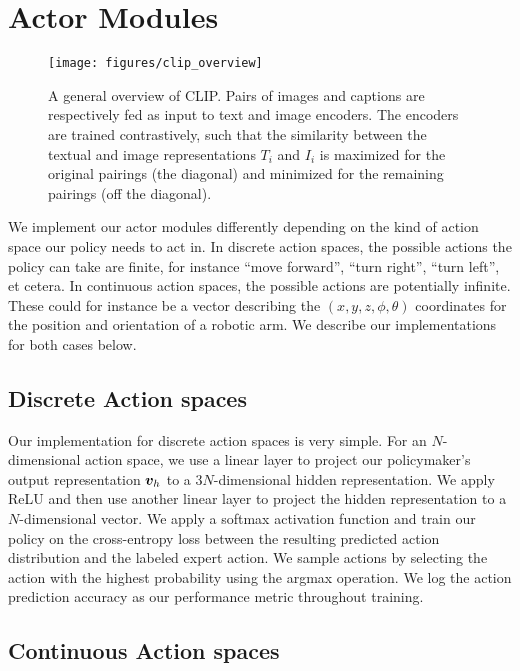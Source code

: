 \documentclass[../main.tex]{subfiles}
\begin{document}
\section{Actor Modules}\label{meth:sec:actor-modules}

\begin{figure}[t]
	\centering
	\texttt{[image: figures/clip\_overview]}
	\caption[General overview of CLIP.]{A general overview of CLIP. Pairs of images and captions are
		respectively fed as input to text and image encoders. The encoders are trained contrastively,
		such that the similarity between the textual and image representations $T_i$ and $I_i$ is
		maximized for the original pairings (the diagonal) and minimized for the remaining pairings (off
		the diagonal).}
	\label{fig:clip}
\end{figure}

We implement our actor modules differently depending on the kind of action space our policy needs to
act in. In discrete action spaces, the possible actions the policy can take are finite, for instance ``move forward'', ``turn right'', ``turn left'', et cetera. In continuous
action spaces, the possible actions are potentially infinite. These could for
instance be a vector describing the $(x, y, z, \phi, \theta)$ coordinates for the position and
orientation of a robotic arm. We describe our implementations for both cases below.

\subsection{Discrete Action spaces}\label{meth:sec:actor-modules:discrete}

Our implementation for discrete action spaces is very simple. For an $N$-dimensional action space,
we use a linear layer to project our policymaker's output representation $\bm v_h$ to
a $3N$-dimensional hidden representation. We apply ReLU and then use another linear layer to project
the hidden representation to a $N$-dimensional vector. We apply a softmax activation function and
train our policy on the cross-entropy loss between the resulting predicted action distribution and
the labeled expert action. We sample actions by selecting the action with the highest probability
using the argmax operation. We log the action prediction accuracy as our performance metric
throughout training.

\subsection{Continuous Action spaces}\label{meth:sec:actor-modules:continuous}
\end{document}
